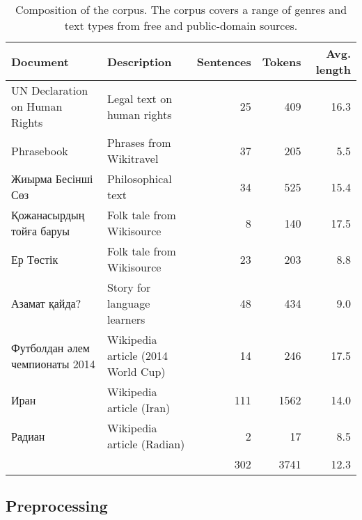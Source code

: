 \documentclass[a4paper,11pt, onecolumn,twoside]{article}
\begin{document}
\begin{table}[htbp]
  \centering
  \caption{Composition of the corpus. The corpus covers a range of genres and text types from free and public-domain sources.}
	\begin{small}
		\begin{tabular}{llrrr}
			\toprule
				\textbf{Document} & \textbf{Description} & \textbf{Sentences} & \textbf{Tokens} & \textbf{Avg. length}\\
			\midrule
				UN Declaration on Human Rights & Legal text on human rights & 25 & 409 & 16.3 \\
				Phrasebook                     & Phrases from Wikitravel   & 37 & 205 & 5.5 \\
				Жиырма Бесінші Сөз             & Philosophical text        & 34 & 525 & 15.4 \\ 
				Қожанасырдың тойға баруы       & Folk tale from Wikisource  & 8 & 140 & 17.5 \\
				Ер Төстік                      & Folk tale from Wikisource  & 23 & 203 & 8.8 \\
				Азамат қайда?                  & Story for language learners & 48 & 434 & 9.0 \\
				Футболдан әлем чемпионаты 2014 & Wikipedia article (2014 World Cup) & 14 & 246 & 17.5 \\
				Иран & Wikipedia article (Iran)                                & 111 & 1562 & 14.0 \\
				Радиан & Wikipedia article (Radian)                            & 2 & 17 & 8.5 \\
			\midrule
			\multicolumn{2}{c}{~} & 302 & 3741 & 12.3 \\\cmidrule[\heavyrulewidth]{3-5}
		\end{tabular}
	\end{small}
\end{table}


\subsection{Preprocessing}

\end{document}
